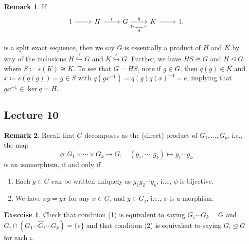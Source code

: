 \documentclass[10pt,letterpaper,cm]{nupset}
\theoremstyle{definition}
\newtheorem{remark}{Remark}
\newtheorem{exercise}{Exercise}
\newcommand{\1}{\mathbf{1}}
\newcommand{\0}{\vec 0}
\begin{document}
\begin{remark}
If  \[
	\begin{tikzcd}
	1\rar & H\rar["i" above] & G\rar["q" above] & K\rar\lar[bend left=30,"s" below] & 1. \\
	\end{tikzcd}
\]
is a split exact sequence, then we say $G$ is essentially a product of $H$ and $K$ by way of the inclusions $H \overset{i}{\hookrightarrow} G$ and $K \overset{s}{\hookrightarrow} G$. Further, we have $HS \cong G$ and $H \unlhd G$ where $S\coloneqq s(K) \cong K$. To see that $G = HS$, note if $g \in G$, then $q(g) \in K$ and $x\coloneqq  s(q(g)) = g \in S$ with $q(gx^{-1}) = q(g)q(x)^{-1} = e$, implying that $gx^{-1} \in \ker q = H$.
\end{remark}

\subsection{Lecture 10}

\begin{remark}
Recall that $G$ decomposes as the (direct) product of $G_1, \ldots, G_k$, i.e., the map $$\phi : G_1 \times \cdots \times G_k \to G, \quad  (g_1, \cdots, g_k) \mapsto g_1\cdots g_k$$ is an isomorphism, if and only if
\begin{enumerate}
\item Each $g\in G$ can be written uniquely as $g_1 g_2\cdots g_k$, i..e, $\phi$ is bijective.
\item We have $xy = yx$ for any $x \in G_i$ and $y\in G_j$, i.e., $\phi$ is a morphism.
\end{enumerate}
\end{remark}

\begin{exercise}
Check that condition (1) is equivalent to saying $G_1 \cdots G_k = G$ and $G_i \cap (G_1 \cdots \widehat{G}_i \cdots G_k) = \{e\}$ and that condition (2) is equivalent to saying $G_i \unlhd G$ for each $i$.
\end{exercise}
\end{document}
